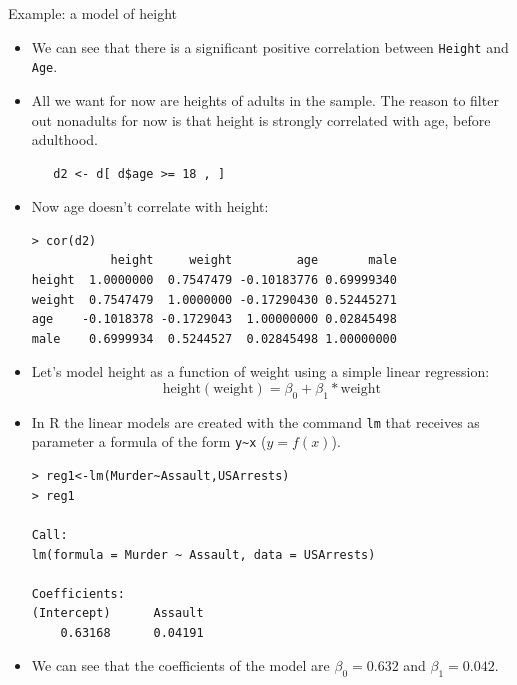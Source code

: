 \documentclass[handout]{beamer}
\begin{document}
\begin{frame}[fragile]{Example: a model of height}
\scriptsize{
\begin{itemize}
 \item We can see that there is a significant positive correlation between \verb+Height+ and \verb+Age+.
 
 \item All we want for now are heights of adults in the sample. The reason to filter out nonadults for now is that height is strongly correlated with age, before adulthood. 
 
  \begin{verbatim}
   d2 <- d[ d$age >= 18 , ]
  \end{verbatim}

 \item Now age doesn't correlate with height:
 

  \begin{verbatim}
> cor(d2)
           height     weight         age       male
height  1.0000000  0.7547479 -0.10183776 0.69999340
weight  0.7547479  1.0000000 -0.17290430 0.52445271
age    -0.1018378 -0.1729043  1.00000000 0.02845498
male    0.6999934  0.5244527  0.02845498 1.00000000
  \end{verbatim} 
 
 
 \item Let's model height as a function of weight using a simple linear regression:
 \begin{displaymath}
  \text{height}(\text{weight})=\beta_0+\beta_1*\text{weight}
 \end{displaymath}
 
  \item In R the linear models are created with the command \verb+lm+ that receives as parameter a formula of the form \verb+y~x+ ($y=f(x)$).
 
 \begin{verbatim}
> reg1<-lm(Murder~Assault,USArrests)
> reg1

Call:
lm(formula = Murder ~ Assault, data = USArrests)

Coefficients:
(Intercept)      Assault  
    0.63168      0.04191    
 \end{verbatim}
 
 \item We can see that the coefficients of the model are $\beta_{0}=0.632$ and $\beta_{1}=0.042$. 
 
 


\end{itemize}
 
 
 
} 
\end{frame}
\end{document}
